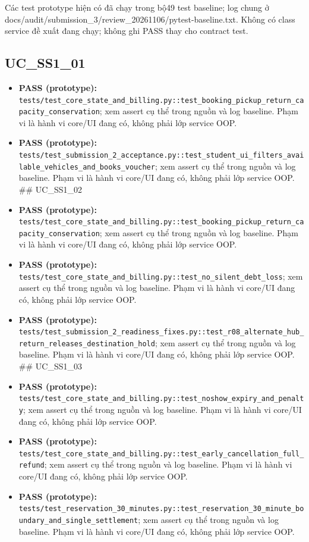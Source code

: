 \documentclass[11pt,a4paper]{article}
\begin{document}
Các test prototype hiện có đã chạy trong bộ49 test baseline; log chung ở
docs/audit/submission\_3/review\_20261106/pytest-baseline.txt. Không có
class service đề xuất đang chạy; không ghi PASS thay cho contract test.

\hypertarget{uc_ss1_01}{%
\subsection{UC\_SS1\_01}\label{uc_ss1_01}}

\begin{itemize}
\item
  \textbf{PASS (prototype):}
  \texttt{tests/test\_core\_state\_and\_billing.py::test\_booking\_pickup\_return\_capacity\_conservation};
  xem assert cụ thể trong nguồn và log baseline. Phạm vi là hành vi
  core/UI đang có, không phải lớp service OOP.
\item
  \textbf{PASS (prototype):}
  \texttt{tests/test\_submission\_2\_acceptance.py::test\_student\_ui\_filters\_available\_vehicles\_and\_books\_voucher};
  xem assert cụ thể trong nguồn và log baseline. Phạm vi là hành vi
  core/UI đang có, không phải lớp service OOP. \#\# UC\_SS1\_02
\item
  \textbf{PASS (prototype):}
  \texttt{tests/test\_core\_state\_and\_billing.py::test\_booking\_pickup\_return\_capacity\_conservation};
  xem assert cụ thể trong nguồn và log baseline. Phạm vi là hành vi
  core/UI đang có, không phải lớp service OOP.
\item
  \textbf{PASS (prototype):}
  \texttt{tests/test\_core\_state\_and\_billing.py::test\_no\_silent\_debt\_loss};
  xem assert cụ thể trong nguồn và log baseline. Phạm vi là hành vi
  core/UI đang có, không phải lớp service OOP.
\item
  \textbf{PASS (prototype):}
  \texttt{tests/test\_submission\_2\_readiness\_fixes.py::test\_r08\_alternate\_hub\_return\_releases\_destination\_hold};
  xem assert cụ thể trong nguồn và log baseline. Phạm vi là hành vi
  core/UI đang có, không phải lớp service OOP. \#\# UC\_SS1\_03
\item
  \textbf{PASS (prototype):}
  \texttt{tests/test\_core\_state\_and\_billing.py::test\_noshow\_expiry\_and\_penalty};
  xem assert cụ thể trong nguồn và log baseline. Phạm vi là hành vi
  core/UI đang có, không phải lớp service OOP.
\item
  \textbf{PASS (prototype):}
  \texttt{tests/test\_core\_state\_and\_billing.py::test\_early\_cancellation\_full\_refund};
  xem assert cụ thể trong nguồn và log baseline. Phạm vi là hành vi
  core/UI đang có, không phải lớp service OOP.
\item
  \textbf{PASS (prototype):}
  \texttt{tests/test\_reservation\_30\_minutes.py::test\_reservation\_30\_minute\_boundary\_and\_single\_settlement};
  xem assert cụ thể trong nguồn và log baseline. Phạm vi là hành vi
  core/UI đang có, không phải lớp service OOP.
\end{itemize}
\end{document}
